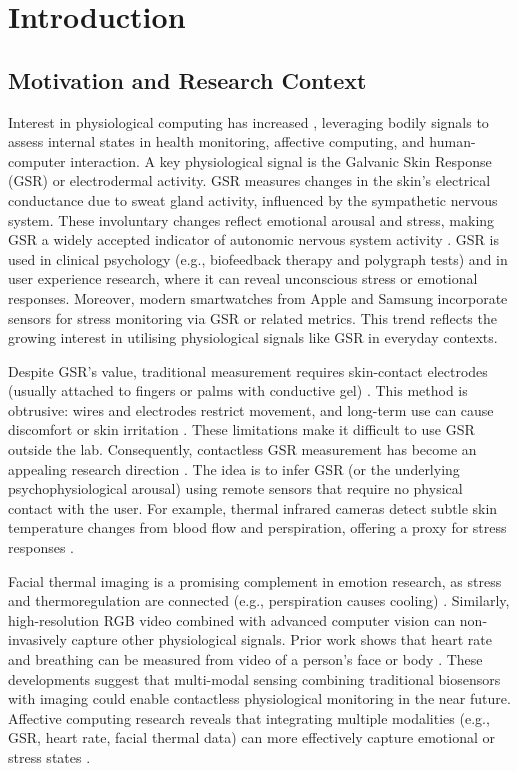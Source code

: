 \chapter{Introduction}


\section{Motivation and Research Context}
Interest in physiological computing has increased \textemdash, leveraging bodily signals to assess internal states in health monitoring, affective computing, and human-computer interaction. A key physiological signal is the Galvanic Skin Response (GSR) or electrodermal activity. GSR measures changes in the skin's electrical conductance due to sweat gland activity, influenced by the sympathetic nervous system. These involuntary changes reflect emotional arousal and stress, making GSR a widely accepted indicator of autonomic nervous system activity \cite{ref1}. GSR is used in clinical psychology (e.g., biofeedback therapy and polygraph tests) and in user experience research, where it can reveal unconscious stress or emotional responses. Moreover, modern smartwatches from Apple and Samsung incorporate sensors for stress monitoring via GSR or related metrics. This trend reflects the growing interest in utilising physiological signals like GSR in everyday contexts.

Despite GSR's value, traditional measurement requires skin-contact electrodes (usually attached to fingers or palms with conductive gel) \cite{ref3}. This method is obtrusive: wires and electrodes restrict movement, and long-term use can cause discomfort or skin irritation \cite{ref3}. These limitations make it difficult to use GSR outside the lab. Consequently, contactless GSR measurement has become an appealing research direction \cite{ref4}. The idea is to infer GSR (or the underlying psychophysiological arousal) using remote sensors that require no physical contact with the user. For example, thermal infrared cameras detect subtle skin temperature changes from blood flow and perspiration, offering a proxy for stress responses \cite{ref5}.

Facial thermal imaging is a promising complement in emotion research, as stress and thermoregulation are connected (e.g., perspiration causes cooling) \cite{ref5}. Similarly, high-resolution RGB video combined with advanced computer vision can non-invasively capture other physiological signals. Prior work shows that heart rate and breathing can be measured from video of a person's face or body \cite{ref6}. These developments suggest that multi-modal sensing \textemdash combining traditional biosensors with imaging \textemdash could enable contactless physiological monitoring in the near future. Affective computing research reveals that integrating multiple modalities (e.g., GSR, heart rate, facial thermal data) can more effectively capture emotional or stress states \cite{ref1}.

